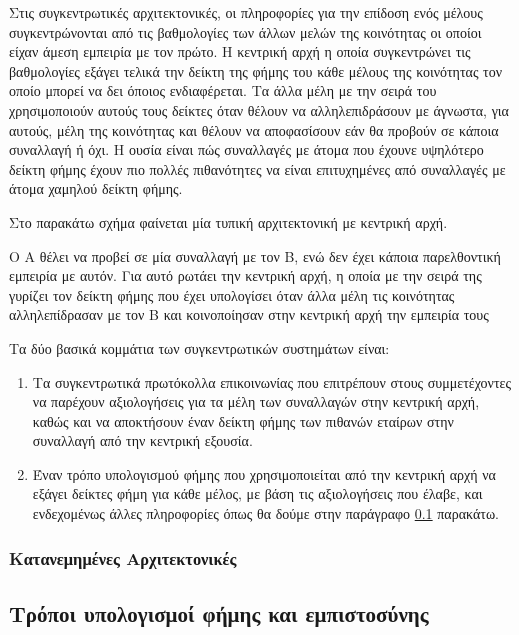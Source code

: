 Στις συγκεντρωτικές αρχιτεκτονικές, οι πληροφορίες για την επίδοση ενός μέλους συγκεντρώνονται από τις βαθμολογίες των άλλων μελών της κοινότητας οι οποίοι είχαν άμεση εμπειρία με τον πρώτο. Η κεντρική αρχή η οποία συγκεντρώνει τις βαθμολογίες εξάγει τελικά την δείκτη της φήμης του κάθε μέλους της κοινότητας τον οποίο μπορεί να δει όποιος ενδιαφέρεται. Τα άλλα μέλη με την σειρά του χρησιμοποιούν αυτούς τους δείκτες όταν θέλουν να αλληλεπιδράσουν με άγνωστα, για αυτούς, μέλη της κοινότητας και θέλουν να αποφασίσουν εάν θα προβούν σε κάποια συναλλαγή ή όχι. Η ουσία είναι πώς συναλλαγές με άτομα που έχουνε υψηλότερο δείκτη φήμης έχουν πιο πολλές πιθανότητες να είναι επιτυχημένες από συναλλαγές με άτομα χαμηλού δείκτη φήμης.

Στο παρακάτω σχήμα φαίνεται μία τυπική αρχιτεκτονική με κεντρική αρχή.

%

Ο Α θέλει να προβεί σε μία συναλλαγή με τον Β, ενώ δεν έχει κάποια παρελθοντική εμπειρία με αυτόν. Για αυτό ρωτάει την κεντρική αρχή, η οποία με την σειρά της γυρίζει τον δείκτη φήμης που έχει υπολογίσει όταν άλλα μέλη τις κοινότητας αλληλεπίδρασαν με τον Β και κοινοποίησαν στην κεντρική αρχή την εμπειρία τους

Τα δύο βασικά κομμάτια των συγκεντρωτικών συστημάτων είναι:
\begin{enumerate}

\item Tα συγκεντρωτικά πρωτόκολλα επικοινωνίας που επιτρέπουν στους συμμετέχοντες να παρέχουν αξιολογήσεις για τα μέλη των συναλλαγών στην κεντρική αρχή, καθώς και να αποκτήσουν έναν δείκτη φήμης των πιθανών εταίρων στην συναλλαγή από την κεντρική εξουσία.

\item Έναν τρόπο υπολογισμού φήμης που χρησιμοποιείται από την κεντρική αρχή να εξάγει δείκτες φήμη για κάθε μέλος, με βάση τις αξιολογήσεις που έλαβε, και ενδεχομένως άλλες πληροφορίες όπως θα δούμε στην παράγραφο \ref{sec:compute} παρακάτω.

\end{enumerate}

\subsubsection{Κατανεμημένες Αρχιτεκτονικές}



\subsection{Τρόποι υπολογισμοί φήμης και εμπιστοσύνης}\label{sec:compute}

